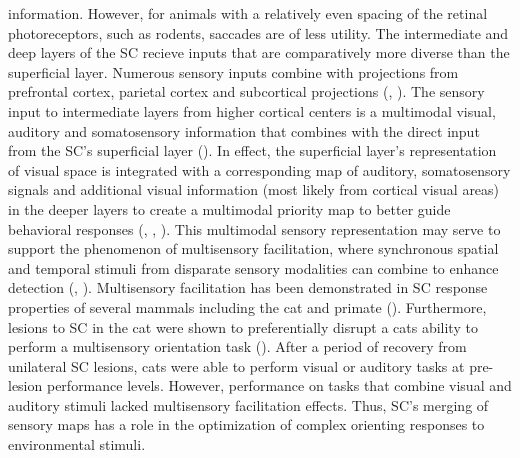 \documentclass{ar-1col}
\begin{document}
{information. However, for animals with a relatively even spacing of the retinal photoreceptors, such as rodents, saccades are of less utility. 
The intermediate and deep layers of the SC recieve inputs that are comparatively more diverse than the superficial layer. Numerous sensory inputs combine with projections from prefrontal cortex, parietal cortex and subcortical projections (\cite{schneider2014brain}, \cite{white2011superior}). The sensory input to intermediate layers from higher cortical centers is a multimodal visual, auditory and somatosensory information that combines with the direct input from the SC’s superficial layer (\cite{meredith1986visual}). In effect, the superficial layer’s representation of visual space is integrated with a corresponding map of auditory, somatosensory signals and additional visual information (most likely from cortical visual areas) in the deeper layers to create a multimodal priority map to better guide behavioral responses (\cite{drager1975responses}, \cite{meredith1986visual}, \cite{king2004superior}). This multimodal sensory representation may serve to support the phenomenon of multisensory facilitation, where synchronous spatial and temporal stimuli from disparate sensory modalities can combine to enhance detection (\cite{welch1986contributions}, \cite{stein1993merging}). Multisensory facilitation has been demonstrated in SC response properties of several mammals including the cat and primate (\cite{wallace1996representation}). Furthermore, lesions to SC in the cat were shown to preferentially disrupt a cats ability to perform a multisensory orientation task (\cite{burnett2004superior}). After a period of recovery from unilateral SC lesions, cats were able to perform visual or auditory tasks at pre-lesion performance levels. However, performance on tasks that combine visual and auditory stimuli lacked multisensory facilitation effects. Thus, SC’s merging of sensory maps has a role in the optimization of complex orienting responses to environmental stimuli. 

}
\end{document}

